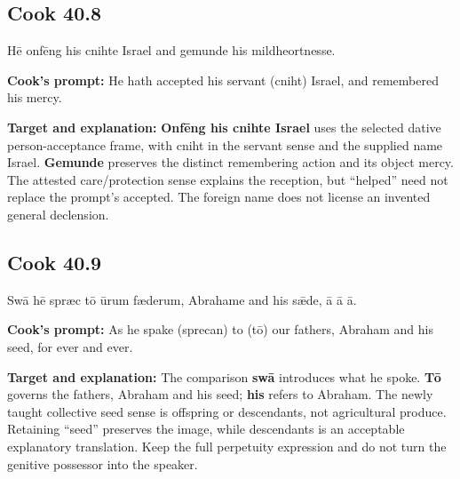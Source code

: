 \par\begin{minipage}{\linewidth}\raggedright
\subsection*{Cook 40.8}

Hē onfēng his cnihte Israel and gemunde his mildheortnesse.

\textbf{Cook's prompt:} He hath accepted his servant (cniht) Israel, and remembered his mercy.

\textbf{Target and explanation:} \textbf{Onfēng his cnihte Israel} uses the selected dative person-acceptance frame, with cniht in the servant sense and the supplied name Israel. \textbf{Gemunde} preserves the distinct remembering action and its object mercy. The attested care/\allowbreak{}protection sense explains the reception, but “helped” need not replace the prompt's accepted. The foreign name does not license an invented general declension.

\end{minipage}\par\addvspace{4pt}

\par\begin{minipage}{\linewidth}\raggedright
\subsection*{Cook 40.9}

Swā hē spræc tō ūrum fæderum, Abrahame and his sǣde, ā ā ā.

\textbf{Cook's prompt:} As he spake (sprecan) to (tō) our fathers, Abraham and his seed, for ever and ever.

\textbf{Target and explanation:} The comparison \textbf{swā} introduces what he spoke. \textbf{Tō} governs the fathers, Abraham and his seed; \textbf{his} refers to Abraham. The newly taught collective seed sense is offspring or descendants, not agricultural produce. Retaining “seed” preserves the image, while descendants is an acceptable explanatory translation. Keep the full perpetuity expression and do not turn the genitive possessor into the speaker.

\end{minipage}\par\addvspace{4pt}


